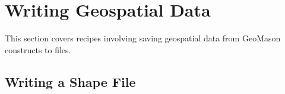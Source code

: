 \documentclass[twoside,10pt]{book}
\begin{document}











\section{Writing Geospatial Data}
\label{sec:writingdata}

This section covers recipes involving saving geospatial data from
GeoMason constructs to files.

\subsection{Writing a Shape File}
\label{sub:writingshapefile}
\end{document}
